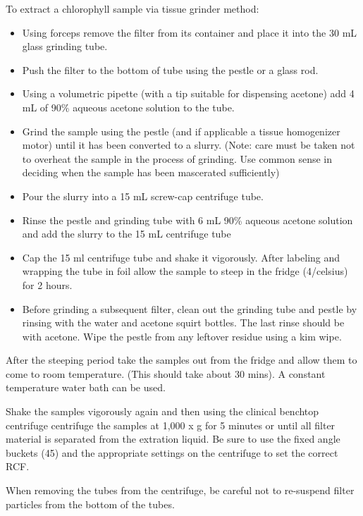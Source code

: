 \documentclass[12pt]{../SOP3}\usepackage[]{graphicx}\usepackage[]{color}
\begin{document}
\NP To extract a chlorophyll sample via tissue grinder method: 
\begin{itemize}
\item Using forceps remove the filter from its container and place it into the 30 mL glass grinding tube.
\item Push the filter to the bottom of tube using the pestle or a glass rod.
\item Using a volumetric pipette (with a tip suitable for dispensing acetone) add 4 mL of 90\% aqueous acetone solution to the tube.
\item Grind the sample using the pestle (and if applicable a tissue homogenizer motor) until it has been converted to a slurry. (Note: care must be taken not to overheat the sample in the process of grinding. Use common sense in deciding when the sample has been mascerated sufficiently)
\item Pour the slurry into a 15 mL screw-cap centrifuge tube. 
\item Rinse the pestle and grinding tube with 6 mL 90\% aqueous acetone solution and add the slurry to the 15 mL centrifuge tube
\item Cap the 15 ml centrifuge tube and shake it vigorously. After labeling and wrapping the tube in foil allow the sample to steep in the fridge (4/celsius) for 2 hours.
\item Before grinding a subsequent filter, clean out the grinding tube and pestle by rinsing with the water and acetone squirt bottles. The last rinse should be with acetone. Wipe the pestle from any leftover residue using a kim wipe.
\end{itemize}

\NP After the steeping period take the samples out from the fridge and allow them to come to room temperature. (This should take about 30 mins). A constant temperature water bath can be used.

\NP Shake the samples vigorously again and then using the clinical benchtop centrifuge centrifuge the samples at 1,000 x g for 5 minutes or until all filter material is separated from the extration liquid. Be sure to use the fixed angle buckets (45\degree) and the appropriate settings on the centrifuge to set the correct RCF. 

\NP When removing the tubes from the centrifuge, be careful not to re-suspend filter particles from the bottom of the tubes.

\end{document}
